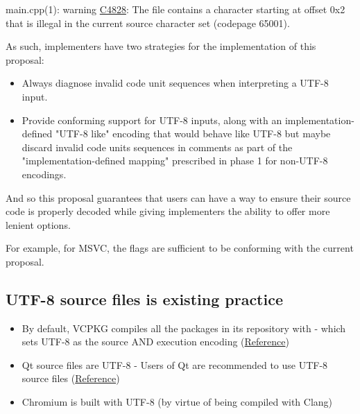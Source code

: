 \documentclass{wg21}
\begin{document}
\begin{quoteblock}
main.cpp(1): warning \href{https://docs.microsoft.com/en-us/cpp/error-messages/compiler-warnings/compiler-warnings-by-compiler-version?view=msvc-160#warnings-introduced-in-visual-studio-2015-update-2-compiler-version-1900239180}{C4828}: The file contains a character starting at offset 0x2 that is illegal in the current source character set (codepage 65001).
\end{quoteblock}

As such, implementers have two strategies for the implementation of this proposal:

\begin{itemize}
\item Always diagnose invalid code unit sequences when interpreting a UTF-8 input.
\item Provide conforming support for UTF-8 inputs, along with an implementation-defined "UTF-8 like" encoding that would behave like UTF-8 but maybe discard
invalid code units sequences in comments as part of the "implementation-defined mapping" prescribed in phase 1 for non-UTF-8 encodings.
\end{itemize}

And so this proposal guarantees that users can have a way to ensure their source code is properly decoded while giving implementers
the ability to offer more lenient options.

For example, for MSVC, the flags  are sufficient to be conforming with the current proposal.


\subsection{UTF-8 source files is existing practice}

\begin{itemize}
    \item By default, VCPKG compiles all the packages in its repository with  - which sets UTF-8 as the source AND execution encoding (\href{https://github.com/vicroms/vcpkg/blob/master/scripts/toolchains/windows.cmake#L16}{Reference})
    \item Qt source files are UTF-8 - Users of Qt are recommended to use UTF-8 source files (\href{https://wiki.qt.io/Strings_and_encodings_in_Qt}{Reference})
    \item Chromium is built with UTF-8 (by virtue of being compiled with Clang)
\end{itemize}
\pagebreak
\end{document}
